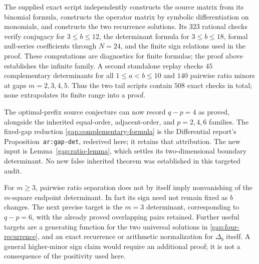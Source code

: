 The supplied exact script independently constructs the source matrix
from its binomial formula, constructs the operator matrix by symbolic
differentiation on monomials, and constructs the two recurrence
solutions. Its $323$ rational checks verify conjugacy for
$3\le b\le12$, the determinant formula for $3\le b\le18$,
formal null-series coefficients through $N=24$, and the finite sign
relations used in the proof. These computations are diagnostics for
finite formulas; the proof above establishes the infinite family.
A second standalone replay checks $45$ complementary determinants
for all $1\le a<b\le10$ and $140$ pairwise ratio minors at gaps
$m=2,3,4,5$. Thus the two tail scripts contain $508$ exact checks
in total; none extrapolates its finite range into a proof.

The optimal-prefix source conjecture can now record $q-p=4$ as
proved, alongside the inherited equal-order, adjacent-order, and
$p=2,4,6$ families. The fixed-gap reduction
\eqref{gap:complementary-formula} is the Differential report's
Proposition~\texttt{ar:gap-det}, rederived here; it retains that
attribution. The new input is Lemma~\ref{gap:ratio-lemma}, which
settles its two-dimensional boundary determinant. No new false
inherited theorem was established in this targeted audit.

For $m\ge3$, pairwise ratio separation does not by itself imply
nonvanishing of the $m$-square endpoint determinant. In fact its
sign need not remain fixed as $b$ changes. The next precise target
is the $m=3$ determinant, corresponding to $q-p=6$, with the
already proved overlapping pairs retained. Further useful targets
are a generating function for the two universal solutions in
\eqref{gap:four-recurrence}, and an exact recurrence or arithmetic
normalization for $\Delta_b$ itself. A general higher-minor sign
claim would require an additional proof; it is not a consequence
of the positivity used here.
